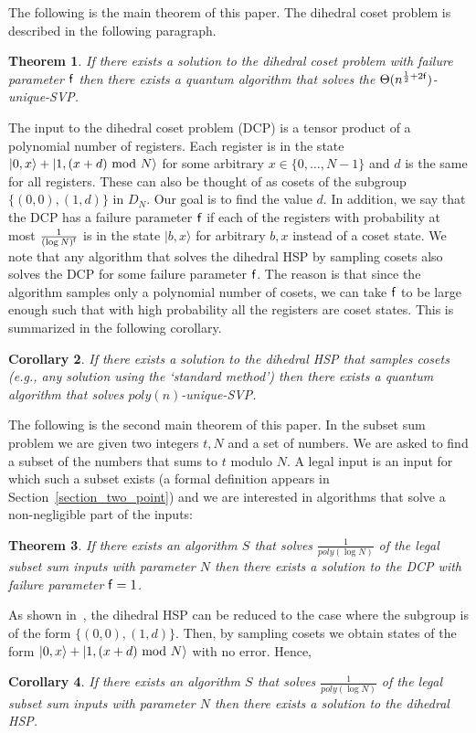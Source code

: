 \documentclass[11pt]{article}
\newtheorem{theorem}{Theorem}[section]
\newtheorem{corollary}[theorem]{Corollary}
\def\mod{{\rm mod}}
\newcommand\ket[1]{{ |{#1} \rangle }}
\begin{document}
The following is the main theorem of this paper. The dihedral coset problem is described in the following paragraph.
\begin{theorem}\label{theorem_svp}
If there exists a solution to the dihedral coset problem with failure parameter ${\sf f}$ then there exists a quantum
algorithm that solves the $\Theta(n^{\frac{1}{2}+2{\sf f}})$-unique-SVP.
\end{theorem}
The input to the dihedral coset problem (DCP) is a tensor product of a polynomial number of registers. Each register is
in the state $\ket{0,x}+\ket{1,(x+d)~\mod~N}$ for some arbitrary $x\in\{0,\ldots,N-1\}$ and $d$ is the same for all
registers. These can also be thought of as cosets of the subgroup $\{(0,0),(1,d)\}$ in $D_N$. Our goal is to find the
value $d$. In addition, we say that the DCP has a failure parameter ${\sf f}$ if each of the registers with probability
at most $\frac{1}{(\log N)^{\sf f}}$ is in the state $\ket{b,x}$ for arbitrary $b,x$ instead of a coset state. We note
that any algorithm that solves the dihedral HSP by sampling cosets also solves the DCP for some failure parameter ${\sf
f}$. The reason is that since the algorithm samples only a polynomial number of cosets, we can take ${\sf f}$ to be
large enough such that with high probability all the registers are coset states. This is summarized in the following
corollary.
\begin{corollary}
If there exists a solution to the dihedral HSP that samples cosets (e.g., any solution using the `standard method')
then there exists a quantum algorithm that solves $poly(n)$-unique-SVP.
\end{corollary}

The following is the second main theorem of this paper. In the subset sum problem we are given two integers $t,N$ and a
set of numbers. We are asked to find a subset of the numbers that sums to $t$ modulo $N$. A legal input is an input for
which such a subset exists (a formal definition appears in Section~\ref{section_two_point}) and we are interested in
algorithms that solve a non-negligible part of the inputs:
\begin{theorem}\label{theorem_two_point}
If there exists an algorithm $S$ that solves $\frac{1}{poly(\log N)}$ of the legal subset sum inputs with parameter $N$
then there exists a solution to the DCP with failure parameter ${\sf f}=1$.
\end{theorem}
As shown in~\cite{EttingerHoyerDihedral}, the dihedral HSP can be reduced to the case where the subgroup is of the form
$\{(0,0),(1,d)\}$. Then, by sampling cosets we obtain states of the form $\ket{0,x}+\ket{1,(x+d)~\mod~N}$ with no
error. Hence,
\begin{corollary}
If there exists an algorithm $S$ that solves $\frac{1}{poly(\log N)}$ of the legal subset sum inputs with parameter $N$
then there exists a solution to the dihedral HSP.
\end{corollary}
\end{document}
